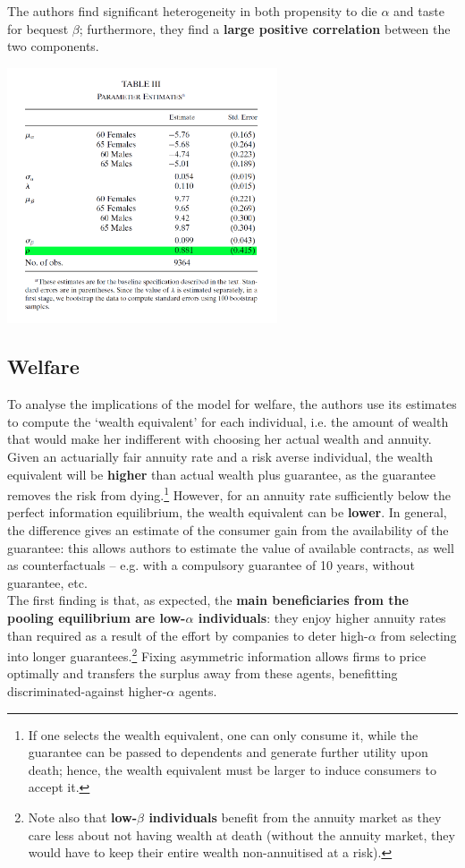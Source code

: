 \documentclass[11pt]{article}
\numberwithin{equation}{section}
\begin{document}
The authors find significant heterogeneity in both propensity to die $\alpha$ and taste for bequest $\beta$; furthermore, they find a \textbf{large positive correlation} between the two components.

\begin{center}
	\includegraphics[width=0.6\textwidth]{efs1}
\end{center}

\subsection{Welfare}

To analyse the implications of the model for welfare, the authors use its estimates to compute the `wealth equivalent' for each individual, i.e. the amount of wealth that would make her indifferent with choosing her actual wealth and annuity.
Given an actuarially fair annuity rate and a risk averse individual, the wealth equivalent will be \textbf{higher} than actual wealth plus guarantee, as the guarantee removes the risk from dying.\footnote{If one selects the wealth equivalent, one can only consume it, while the guarantee can be passed to dependents and generate further utility upon death; hence, the wealth equivalent must be larger to induce consumers to accept it.}
However, for an annuity rate sufficiently below the perfect information equilibrium, the wealth equivalent can be \textbf{lower}.
In general, the difference gives an estimate of the consumer gain from the availability of the guarantee: this allows authors to estimate the value of available contracts, as well as counterfactuals -- e.g. with a compulsory guarantee of 10 years, without guarantee, etc. \\

The first finding is that, as expected, the \textbf{main beneficiaries from the pooling equilibrium are low-$\alpha$ individuals}: they enjoy higher annuity rates than required as a result of the effort by companies to deter high-$\alpha$ from selecting into longer guarantees.\footnote{Note also that \textbf{low-$\beta$ individuals} benefit from the annuity market as they care less about not having wealth at death (without the annuity market, they would have to keep their entire wealth non-annuitised at a risk).}
Fixing asymmetric information allows firms to price optimally and transfers the surplus away from these agents, benefitting discriminated-against higher-$\alpha$ agents. \\
\end{document}
